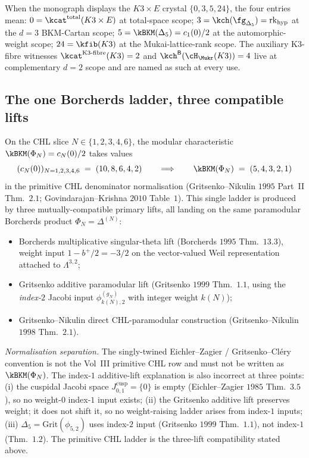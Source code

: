 \begin{corollary}
\label{wn:cor:second-pass-scope-discipline}
When the monograph displays the $K3\times E$ crystal
$\{0, 3, 5, 24\}$, the four entries mean:
$0 = \kcat^{\mathrm{total}}(K3\times E)$ at total-space scope;
$3 = \kch(\fg_{\Delta_5}) = \mathrm{rk}_{\mathrm{hyp}}$ at the
$d = 3$ BKM-Cartan scope;
$5 = \kBKM(\Delta_5) = c_1(0)/2$ at the automorphic-weight scope;
$24 = \kfib(K3)$ at the Mukai-lattice-rank scope.
The auxiliary K3-fibre witnesses
$\kcat^{\mathrm{K3\text{-}fibre}}(K3)=2$ and
$\kch^{\mathsf{B}}(\cH_{\Mukr}(K3))=4$ live at complementary $d=2$
scope and are named as such at every use.
\end{corollary}

\subsection{The one Borcherds ladder, three compatible lifts}
\label{wn:subsec:second-pass-one-ladder}

\begin{theorem}
\label{wn:thm:second-pass-single-ladder}
On the CHL slice $N \in \{1, 2, 3, 4, 6\}$, the modular
characteristic $\kBKM(\Phi_N) = c_N(0)/2$ takes values
\[
(c_N(0))_{N=1,2,3,4,6} \;=\; (10, 8, 6, 4, 2)
\qquad\Longrightarrow\qquad
\kBKM(\Phi_N) \;=\; (5, 4, 3, 2, 1)
\]
in the primitive CHL denominator normalisation
(Gritsenko--Nikulin $1995$ Part~II Thm.~$2.1$; Govindarajan--Krishna
$2010$ Table~$1$).  This single ladder is produced by three
mutually-compatible primary lifts, all landing on the same paramodular
Borcherds product
$\Phi_N = \Delta^{(N)}$:
\begin{itemize}
\item Borcherds multiplicative singular-theta lift
(Borcherds $1995$ Thm.~$13.3$), weight input $1 - b^+/2 = -3/2$ on the
vector-valued Weil representation attached to $\Lambda^{3,2}$;
\item Gritsenko additive paramodular lift
(Gritsenko $1999$ Thm.~$1.1$, using the \emph{index-$2$} Jacobi input
$\phi^{(g_N)}_{k(N), 2}$ with integer weight $k(N)$);
\item Gritsenko--Nikulin direct CHL-paramodular construction
(Gritsenko--Nikulin $1998$ Thm.~$2.1$).
\end{itemize}

\emph{Normalisation separation.} The singly-twined Eichler--Zagier /
Gritsenko--Cl\'ery convention is not the Vol~III primitive CHL row and
must not be written as $\kBKM(\Phi_N)$.  The index-$1$ additive-lift
explanation is also
incorrect at three points: (i) the cuspidal Jacobi space
$J^{\mathrm{cusp}}_{0, 1} = \{0\}$ is empty (Eichler--Zagier $1985$
Thm.~$3.5$), so no weight-$0$ index-$1$ input exists; (ii) the
Gritsenko additive lift preserves weight; it does not shift it, so
no weight-raising ladder arises from index-$1$ inputs; (iii)
$\Delta_5 = \mathrm{Grit}(\phi_{5, 2})$ uses index-$2$ input
(Gritsenko $1999$ Thm.~$1.1$), not index-$1$ (Thm.~$1.2$). The
primitive CHL ladder is the three-lift compatibility stated above.
\end{theorem}


